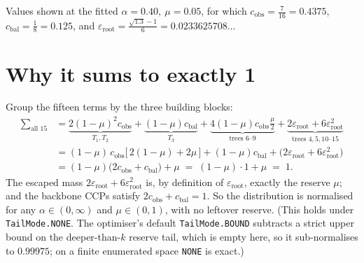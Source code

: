 \documentclass[11pt]{article}
\newcommand{\cobs}{c_{\mathrm{obs}}}
\newcommand{\cbal}{c_{\mathrm{bal}}}
\newcommand{\eroot}{\varepsilon_{\mathrm{root}}}
\begin{document}
\noindent Values shown at the fitted $\alpha=0.40,\ \mu=0.05$, for which
$\cobs=\tfrac{7}{16}=0.4375$, $\cbal=\tfrac18=0.125$, and
$\eroot=\tfrac{\sqrt{1.3}-1}{6}=0.0233625708\ldots$

\section*{Why it sums to exactly 1}

Group the fifteen terms by the three building blocks:
\begin{align*}
\sum_{\text{all }15}
&= \underbrace{2(1-\mu)^2\cobs}_{T_1,T_2}
 + \underbrace{(1-\mu)\cbal}_{T_3}
 + \underbrace{4(1-\mu)\cobs\tfrac{\mu}{2}}_{\text{trees }6\text{--}9}
 + \underbrace{2\eroot + 6\eroot^2}_{\text{trees }4,5,10\text{--}15} \\[2pt]
&= (1-\mu)\,\cobs\big[\,2(1-\mu)+2\mu\,\big] + (1-\mu)\cbal + \big(2\eroot+6\eroot^2\big)\\[2pt]
&= (1-\mu)\big(2\cobs+\cbal\big) + \mu
 \;=\; (1-\mu)\cdot 1 + \mu \;=\; 1.
\end{align*}
The escaped mass $2\eroot+6\eroot^2$ is, by definition of $\eroot$,
exactly the reserve $\mu$; and the backbone CCPs satisfy $2\cobs+\cbal=1$. So the
distribution is normalised for any $\alpha\in(0,\infty)$ and $\mu\in(0,1)$, with
no leftover reserve. (This holds under \texttt{TailMode.NONE}. The optimiser's
default \texttt{TailMode.BOUND} subtracts a strict upper bound on the
deeper-than-$k$ reserve tail, which is empty here, so it sub-normalises to
$0.99975$; on a finite enumerated space \texttt{NONE} is exact.)
\end{document}
